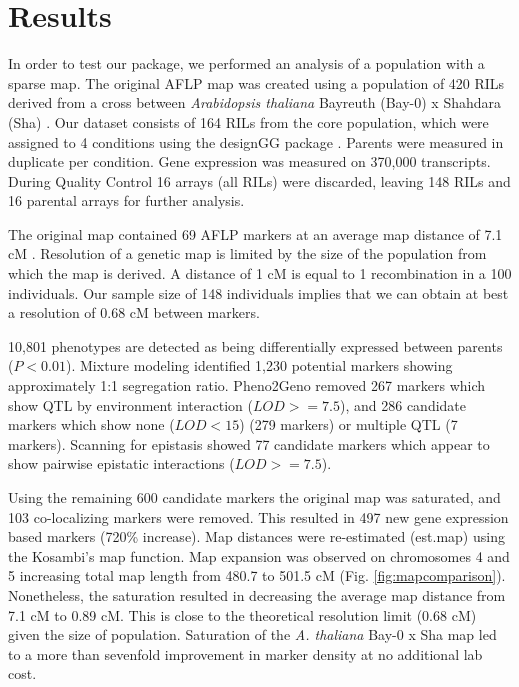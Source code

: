 \section{Results}
In order to test our package, we performed an analysis of a population with a sparse map.
The original AFLP map was created using a population of 420 RILs derived from a cross between 
\emph{Arabidopsis thaliana} Bayreuth (Bay-0) x Shahdara (Sha) \cite{Loudet:2002}. 
Our dataset consists of 164 RILs from the core population, which were assigned to 4 conditions 
using the designGG package \cite{Li:2009}. Parents were measured in duplicate per condition. 
Gene expression was measured on 370,000 transcripts. During Quality Control 16 arrays 
(all RILs) were discarded, leaving 148 RILs and 16 parental arrays for further analysis.

The original map contained 69 AFLP markers at an average map distance of 7.1 cM \cite{Loudet:2002}. 
Resolution of a genetic map is limited by the size of the population from which the map is derived. 
A distance of 1 cM is equal to 1 recombination in a 100 individuals. Our sample size of 148 
individuals implies that we can obtain at best a resolution of 0.68 cM between markers.

10,801 phenotypes are detected as being differentially expressed between parents 
($P < 0.01$). Mixture modeling identified 1,230 potential markers showing approximately 1:1 
segregation ratio. Pheno2Geno removed 267 markers which show QTL by environment interaction
($LOD >= 7.5$), and 286 candidate markers which show none ($LOD < 15$) (279 markers) or 
multiple QTL (7 markers). Scanning for epistasis showed 77 candidate markers which appear to 
show pairwise epistatic interactions ($LOD >= 7.5$). 

Using the remaining 600 candidate markers the original map was saturated, and 103 co-localizing 
markers were removed. This resulted in 497 new gene expression based markers (720\% increase). 
Map distances were re-estimated (est.map) using the Kosambi's map function. Map expansion was 
observed on chromosomes 4 and 5 increasing total map length from 480.7 to 501.5 
cM (Fig. \ref{fig:mapcomparison}). Nonetheless, the saturation resulted in decreasing the average map distance 
from 7.1 cM to 0.89 cM. This is close to the theoretical resolution limit (0.68 cM) given 
the size of population. Saturation of the \emph{A. thaliana} Bay-0 x Sha map led to a more 
than sevenfold improvement in marker density at no additional lab cost. 

